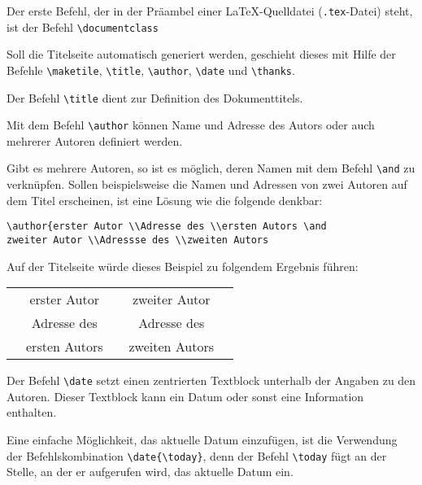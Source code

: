 Der erste Befehl, der in der Präambel einer \LaTeX-Quelldatei (\verb!.tex!-Datei) steht, ist der Befehl \verb!\documentclass!
\begin{document}
Soll die Titelseite automatisch generiert werden, geschieht dieses mit Hilfe der Befehle 
\verb!\maketile!, \verb!\title!, \verb!\author!, \verb!\date! und \verb!\thanks!.

Der Befehl \verb!\title! dient zur Definition des Dokumenttitels. 


Mit dem Befehl \verb!\author! können Name und Adresse des Autors oder 
auch mehrerer Autoren definiert werden.


Gibt es mehrere Autoren, so ist es möglich,
deren Namen mit dem Befehl \verb!\and! zu verknüpfen. Sollen beispielsweise die Namen und Adressen von zwei Autoren auf dem Titel erscheinen, ist eine Lösung wie die folgende denkbar:


\begin{Verbatim}[frame=single]
\author{erster Autor \\Adresse des \\ersten Autors \and
zweiter Autor \\Adressse des \\zweiten Autors
\end{Verbatim}

Auf der Titelseite würde dieses Beispiel zu folgendem Ergebnis führen:

\begin{center}
\begin{tabular}{p{1cm}cp{3cm}cp{1cm}}
& erster Autor  & & zweiter Autor   & \\
& Adresse des   & & Adresse des     & \\
& ersten Autors & & zweiten Autors  & \\
\end{tabular}
\end{center}

Der Befehl \verb!\date! setzt einen
zentrierten Textblock unterhalb der Angaben zu
den Autoren. Dieser Textblock kann ein Datum oder sonst eine Information enthalten.


Eine einfache Möglichkeit, das aktuelle Datum einzufügen, ist die Verwendung der Befehlskombination \verb!\date{\today}!, 
denn der Befehl \verb!\today!
fügt an der Stelle, an der er aufgerufen wird, das aktuelle Datum ein.
\end{document}
